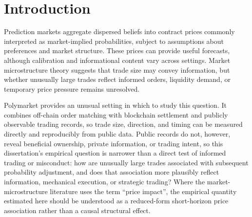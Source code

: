 
\section{Introduction}
\label{sec:introduction}

Prediction markets aggregate dispersed beliefs into contract prices commonly interpreted as market-implied probabilities, subject to assumptions about preferences and market structure. These prices can provide useful forecasts, although calibration and informational content vary across settings. Market microstructure theory suggests that trade size may convey information, but whether unusually large trades reflect informed orders, liquidity demand, or temporary price pressure remains unresolved.

Polymarket provides an unusual setting in which to study this question. It combines off-chain order matching with blockchain settlement and publicly observable trading records, so trade size, direction, and timing can be measured directly and reproducibly from public data. Public records do not, however, reveal beneficial ownership, private information, or trading intent, so this dissertation's empirical question is narrower than a direct test of informed trading or misconduct: how are unusually large trades associated with subsequent probability adjustment, and does that association more plausibly reflect information, mechanical execution, or strategic trading? Where the market-microstructure literature uses the term ``price impact'', the empirical quantity estimated here should be understood as a reduced-form short-horizon price association rather than a causal structural effect.

